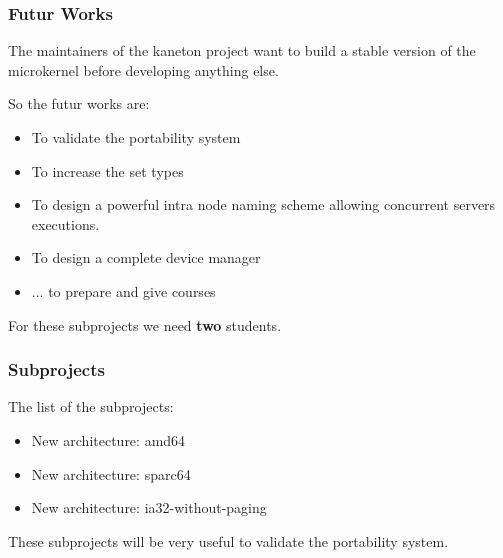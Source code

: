 \documentclass[8pt]{beamer}
\newcommand{\nl}[0]{\vspace{0.4cm}}
\begin{document}

\begin{frame}
  \frametitle{Futur Works}

  The maintainers of the kaneton project want to build a stable version
  of the microkernel before developing anything else.

  \nl

  So the futur works are:

  \begin{itemize}[<+->]
    \item
      To validate the portability system
    \item
      To increase the set types
    \item
      To design a powerful intra node naming scheme allowing concurrent
      servers executions.
    \item
      To design a complete device manager
    \item
      ... to prepare and give courses
  \end{itemize}

  \nl

  For these subprojects we need \textbf{two} students.
\end{frame}


\begin{frame}
  \frametitle{Subprojects}

  The list of the subprojects:

  \begin{itemize}[<+->]
    \item
      New architecture: amd64
    \item
      New architecture: sparc64
    \item
      New architecture: ia32-without-paging
  \end{itemize}

  These subprojects will be very useful to validate the portability
  system.
\end{frame}
\end{document}
